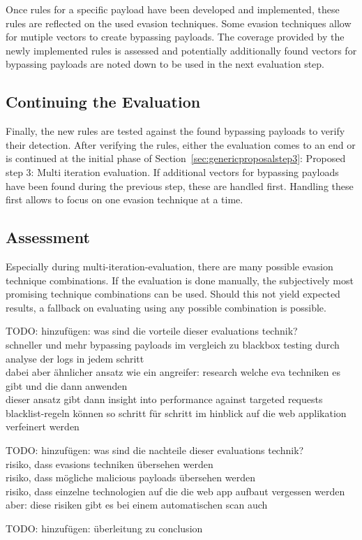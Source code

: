 Once rules for a specific payload have been developed and implemented, these rules are reflected on the used evasion techniques. Some evasion techniques allow for mutiple vectors to create bypassing payloads. The coverage provided by the newly implemented rules is assessed and potentially additionally found vectors for bypassing payloads are noted down to be used in the next evaluation step. 
\subsection{Continuing the Evaluation}
Finally, the new rules are tested against the found bypassing payloads to verify their detection. After verifying the rules, either the evaluation comes to an end or is continued at the initial phase of Section~\ref{sec:genericproposalstep3}: Proposed step 3: Multi iteration evaluation. If additional vectors for bypassing payloads have been found during the previous step, these are handled first. Handling these first allows to focus on one evasion technique at a time.

\subsection{Assessment}

Especially during multi-iteration-evaluation, there are many possible evasion technique combinations. If the evaluation is done manually, the subjectively most promising technique combinations can be used. Should this not yield expected results, a fallback on evaluating using any possible combination is possible.

{\color{red} TODO: hinzufügen: was sind die vorteile dieser evaluations technik?  \\
schneller und mehr bypassing payloads im vergleich zu blackbox testing durch analyse der logs in jedem schritt \\
dabei aber ähnlicher ansatz wie ein angreifer: research welche eva techniken es gibt und die dann anwenden \\
dieser ansatz gibt dann insight into performance against targeted requests \\
blacklist-regeln können so schritt für schritt im hinblick auf die web applikation verfeinert werden \\
}


{\color{red} TODO: hinzufügen: was sind die nachteile dieser evaluations technik? \\
risiko, dass evasions techniken übersehen werden \\
risiko, dass mögliche malicious payloads übersehen werden \\
risiko, dass einzelne technologien auf die die web app aufbaut vergessen werden \\
aber: diese risiken gibt es bei einem automatischen scan auch \\
}

{\color{red} TODO: hinzufügen: überleitung zu conclusion }
